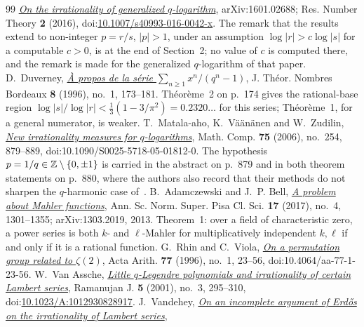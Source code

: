\documentclass[11pt]{article}
\begin{document}
\begin{thebibliography}{99}
  \href{https://arxiv.org/abs/1601.02688}{\emph{On the irrationality of
  generalized \(q\)-logarithm}}, arXiv:1601.02688; Res. Number Theory
  \textbf{2} (2016),
  doi:\href{https://doi.org/10.1007/s40993-016-0042-x}{10.1007/s40993-016-0042-x}.
  The remark that the results extend to non-integer \(p=r/s\), \(|p|>1\), under
  an assumption \(\log|r|>c\log|s|\) for a computable \(c>0\), is at the end of
  Section~2; no value of \(c\) is computed there, and the remark is made for the
  generalized \(q\)-logarithm of that paper.
 D.~Duverney,
  \href{https://numdam.org/item/JTNB_1996__8_1_173_0.pdf}{\emph{\`A propos de la
  s\'erie $\sum_{n\ge1}x^{n}/(q^{n}-1)$}},
  J. Th\'eor. Nombres Bordeaux \textbf{8} (1996), no.~1, 173--181.
  Th\'eor\`eme~2 on p.~174 gives the rational-base region
  $\log|s|/\log|r|<\frac13(1-3/\pi^{2})=0.2320\ldots$ for this series;
  Th\'eor\`eme~1, for a general numerator, is weaker.
 T.~Matala-aho, K.~V\"a\"an\"anen and W.~Zudilin,
  \href{https://doi.org/10.1090/S0025-5718-05-01812-0}{\emph{New irrationality
  measures for \(q\)-logarithms}}, Math. Comp. \textbf{75} (2006), no.~254,
  879--889, doi:10.1090/S0025-5718-05-01812-0.  The hypothesis
  \(p=1/q\in\mathbb{Z}\mathbin{\backslash}\{0,\pm1\}\) is carried in the abstract on p.~879 and in
  both theorem statements on p.~880, where the authors also record that their
  methods do not sharpen the \(q\)-harmonic case of~\cite{zudilin2004}.
 B.~Adamczewski and J.~P. Bell,
  \href{https://arxiv.org/abs/1303.2019}{\emph{A problem about Mahler
  functions}}, Ann. Sc. Norm. Super. Pisa Cl. Sci. \textbf{17} (2017), no.~4,
  1301--1355; arXiv:1303.2019, 2013.  Theorem~1: over a field of characteristic
  zero, a power series is both \(k\)- and \(\ell\)-Mahler for multiplicatively
  independent \(k,\ell\) if and only if it is a rational function.
 G.~Rhin and C.~Viola,
  \href{https://geodesic.mathdoc.fr/articles/10.4064/aa-77-1-23-56/}
  {\emph{On a permutation group related to $\zeta(2)$}},
  Acta Arith. \textbf{77} (1996), no.~1, 23--56,
  doi:10.4064/aa-77-1-23-56.
 W.~Van Assche,
  \href{https://arxiv.org/abs/math/0101187}{\emph{Little \(q\)-Legendre
  polynomials and irrationality of certain Lambert series}},
  Ramanujan J. \textbf{5} (2001), no.~3, 295--310,
  doi:\href{https://doi.org/10.1023/A:1012930828917}{10.1023/A:1012930828917}.
 J.~Vandehey,
  \href{https://arxiv.org/abs/1206.0340}{\emph{On an incomplete argument of
  Erd\H{o}s on the irrationality of Lambert series}},

\end{thebibliography}
\end{document}
